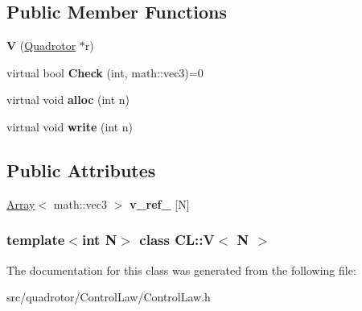 \subsection*{\-Public \-Member \-Functions}
\begin{DoxyCompactItemize}
\item 
\hypertarget{classCL_1_1V_abebb60fede42f7c660791e66c3bcd7cd}{{\bfseries \-V} (\hyperlink{classQuadrotor}{\-Quadrotor} $\ast$r)}\label{classCL_1_1V_abebb60fede42f7c660791e66c3bcd7cd}

\item 
\hypertarget{classCL_1_1V_ae26d7f9cdd0c82cde2fb483e3adae0e4}{virtual bool {\bfseries \-Check} (int, math\-::vec3)=0}\label{classCL_1_1V_ae26d7f9cdd0c82cde2fb483e3adae0e4}

\item 
\hypertarget{classCL_1_1V_afb721f361ca6c16e2214922fddfd0aa5}{virtual void {\bfseries alloc} (int n)}\label{classCL_1_1V_afb721f361ca6c16e2214922fddfd0aa5}

\item 
\hypertarget{classCL_1_1V_aeec78b8c6a02cc18e4121b6599251275}{virtual void {\bfseries write} (int n)}\label{classCL_1_1V_aeec78b8c6a02cc18e4121b6599251275}

\end{DoxyCompactItemize}
\subsection*{\-Public \-Attributes}
\begin{DoxyCompactItemize}
\item 
\hypertarget{classCL_1_1V_aa556065fca27e51e6a911514a74e0e07}{\hyperlink{classArray}{\-Array}$<$ math\-::vec3 $>$ {\bfseries v\-\_\-ref\-\_\-} \mbox{[}\-N\mbox{]}}\label{classCL_1_1V_aa556065fca27e51e6a911514a74e0e07}

\end{DoxyCompactItemize}
\subsubsection*{template$<$int \-N$>$ class C\-L\-::\-V$<$ N $>$}



\-The documentation for this class was generated from the following file\-:\begin{DoxyCompactItemize}
\item 
src/quadrotor/\-Control\-Law/\-Control\-Law.\-h\end{DoxyCompactItemize}
